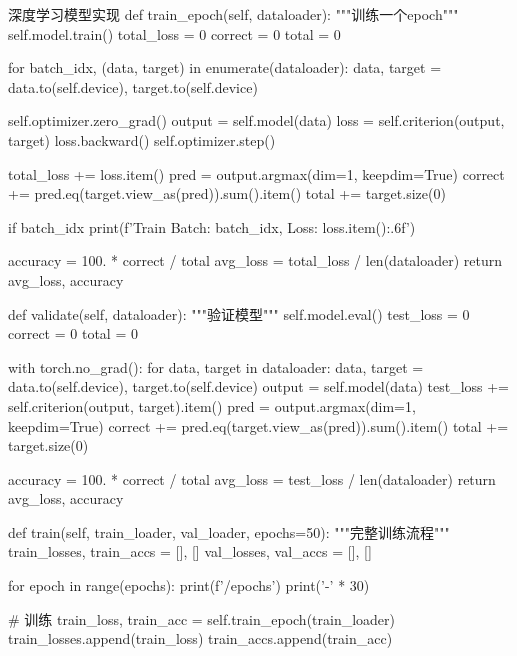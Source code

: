 \begin{longcodebox}[python]{深度学习模型实现}
    def train_epoch(self, dataloader):
        """训练一个epoch"""
        self.model.train()
        total_loss = 0
        correct = 0
        total = 0
        
        for batch_idx, (data, target) in enumerate(dataloader):
            data, target = data.to(self.device), target.to(self.device)
            
            self.optimizer.zero_grad()
            output = self.model(data)
            loss = self.criterion(output, target)
            loss.backward()
            self.optimizer.step()
            
            total_loss += loss.item()
            pred = output.argmax(dim=1, keepdim=True)
            correct += pred.eq(target.view_as(pred)).sum().item()
            total += target.size(0)
            
            if batch_idx %
                print(f'Train Batch: {batch_idx}, Loss: {loss.item():.6f}')
        
        accuracy = 100. * correct / total
        avg_loss = total_loss / len(dataloader)
        return avg_loss, accuracy
    
    def validate(self, dataloader):
        """验证模型"""
        self.model.eval()
        test_loss = 0
        correct = 0
        total = 0
        
        with torch.no_grad():
            for data, target in dataloader:
                data, target = data.to(self.device), target.to(self.device)
                output = self.model(data)
                test_loss += self.criterion(output, target).item()
                pred = output.argmax(dim=1, keepdim=True)
                correct += pred.eq(target.view_as(pred)).sum().item()
                total += target.size(0)
        
        accuracy = 100. * correct / total
        avg_loss = test_loss / len(dataloader)
        return avg_loss, accuracy
    
    def train(self, train_loader, val_loader, epochs=50):
        """完整训练流程"""
        train_losses, train_accs = [], []
        val_losses, val_accs = [], []
        
        for epoch in range(epochs):
            print(f'/{epochs}')
            print('-' * 30)
            
            # 训练
            train_loss, train_acc = self.train_epoch(train_loader)
            train_losses.append(train_loss)
            train_accs.append(train_acc)
            

\end{longcodebox}
